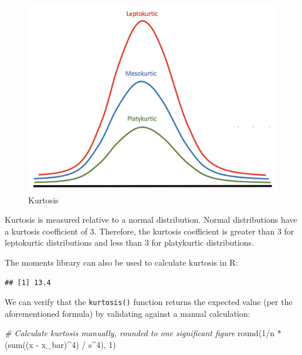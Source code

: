 \documentclass[
]{book}
\newenvironment{Shaded}{\begin{snugshade}}{\end{snugshade}}
\newcommand{\CommentTok}[1]{\textcolor[rgb]{0.56,0.35,0.01}{\textit{#1}}}
\newcommand{\DecValTok}[1]{\textcolor[rgb]{0.00,0.00,0.81}{#1}}
\newcommand{\FunctionTok}[1]{\textcolor[rgb]{0.00,0.00,0.00}{#1}}
\newcommand{\NormalTok}[1]{#1}
\newcommand{\SpecialCharTok}[1]{\textcolor[rgb]{0.00,0.00,0.00}{#1}}
\begin{document}
\begin{figure}

{\centering \includegraphics[width=0.75\linewidth]{graphics/kurtosis} 

}

\caption{Kurtosis}\label{fig:kurtosis}
\end{figure}

Kurtosis is measured relative to a normal distribution. Normal distributions have a kurtosis coefficient of 3. Therefore, the kurtosis coefficient is greater than 3 for leptokurtic distributions and less than 3 for platykurtic distributions.

The moments library can also be used to calculate kurtosis in R:

\begin{Shaded}
\end{Shaded}

\begin{verbatim}
## [1] 13.4
\end{verbatim}

We can verify that the \texttt{kurtosis()} function returns the expected value (per the aforementioned formula) by validating against a manual calculation:

\begin{Shaded}
\begin{Highlighting}[]
\CommentTok{\# Calculate kurtosis manually, rounded to one significant figure}
\FunctionTok{round}\NormalTok{(}\DecValTok{1}\SpecialCharTok{/}\NormalTok{n }\SpecialCharTok{*}\NormalTok{ (}\FunctionTok{sum}\NormalTok{((x }\SpecialCharTok{{-}}\NormalTok{ x\_bar)}\SpecialCharTok{\^{}}\DecValTok{4}\NormalTok{) }\SpecialCharTok{/}\NormalTok{ s}\SpecialCharTok{\^{}}\DecValTok{4}\NormalTok{), }\DecValTok{1}\NormalTok{)}
\end{Highlighting}
\end{Shaded}
\end{document}
